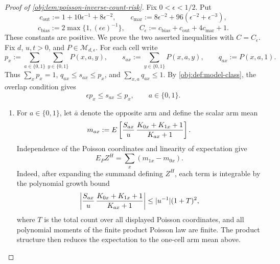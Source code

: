 \begin{proof}[Proof of \cref{obj:lem:poisson-inverse-count-risk}]
Fix \(0<\epsilon<1/2\).  Put
\[
c_{\mathrm{out}}:=1+10\epsilon^{-1}+8\epsilon^{-2},\qquad
c_{\mathrm{mar}}:=8\epsilon^{-2}+96(\epsilon^{-2}+\epsilon^{-3}),
\]
\[
c_{\mathrm{bias}}:=2\max\{1,(\epsilon e)^{-1}\},
\qquad
C_\epsilon:=c_{\mathrm{bias}}+c_{\mathrm{out}}+4c_{\mathrm{mar}}+1 .
\]
These constants are positive.  We prove the two asserted inequalities with
\(C=C_\epsilon\).  Fix \(d\), \(u,t>0\), and \(P\in\mathcal M_{d,\epsilon}\).
For each cell write
\[
p_x:=\sum_{a\in\{0,1\}}\sum_{y\in\{0,1\}}P(x,a,y),
\qquad
s_{ax}:=\sum_{y\in\{0,1\}}P(x,a,y),
\qquad
q_{ax}:=P(x,a,1).
\]
Thus \(\sum_xp_x=1\), \(q_{ax}\le s_{ax}\le p_x\), and \(\sum_{x,a}q_{ax}\le1\).  By \cref{obj:def:model-class}, the overlap condition gives
\[
\epsilon p_x\le s_{ax}\le p_x,\qquad a\in\{0,1\}.
\]

\begin{enumerate}
\item
For \(a\in\{0,1\}\), let \(\bar a\) denote the opposite arm and define the scalar arm mean
\[
m_{ax}:=
E\left[
{S_{ax}\over u}\,
{K_{0x}+K_{1x}+1\over K_{ax}+1}
\right].
\]
Independence of the Poisson coordinates and linearity of expectation give
\[
E_P Z^H=\sum_x(m_{1x}-m_{0x}).
\]
Indeed, after expanding the summand defining \(Z^H\), each term is integrable by the polynomial growth bound
\[
\left|
{S_{ax}\over u}\,
{K_{0x}+K_{1x}+1\over K_{ax}+1}
\right|
\le
|u^{-1}|(1+T)^2 ,
\]
where \(T\) is the total count over all displayed Poisson coordinates, and all polynomial moments of the finite product Poisson law are finite.  The product structure then reduces the expectation to the one-cell arm mean above. %


\end{enumerate}
\end{proof}
